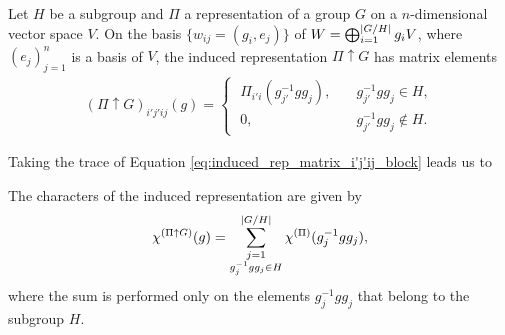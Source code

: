 \documentclass[12pt]{report}
\begin{document}
%

\begin{lemma} \label{lemma:induced_rep_matrix_i'j'ij_block}
Let $H$ be a subgroup and $\Pi$ a representation of a group $G$ on a $n$-dimensional vector space $V$. On the basis $\{w_{ij} = (g_i, e_j)\}$ of $W = \bigoplus_{i=1}^{\abs{G/H}} g_i V$, where $(e_j)_{j=1}^n$ is a basis of $V$, the induced representation $\Pi \uparrow G$ has matrix elements
\begin{align} \label{eq:induced_rep_matrix_i'j'ij_block}
(\Pi \uparrow G)_{i'j'ij}(g) =
\begin{cases}
\; \Pi_{i'i}(g_{j'}^{-1} g g_j), \quad & g_{j'}^{-1} g g_j \in H, \\
\; 0,  & g_{j'}^{-1} g g_j \notin H.
\end{cases}
\end{align}
\end{lemma}

Taking the trace of Equation \ref{eq:induced_rep_matrix_i'j'ij_block} leads us to

\begin{corollary} \label{coro:character_of_induced_rep}
The characters of the induced representation are given by
\begin{equation} \label{eq:character_induced_rep}
\chi^{(\Pi \uparrow G)}(g) = \sum_{\substack{j=1 \\ g_j^{-1} g g_j \in H}}^{\abs{G/H}} \chi^{(\Pi)} (g_j^{-1} g g_j),
\end{equation}
where the sum is performed only on the elements $g_j^{-1} g g_j$ that belong to the subgroup $H$.
\end{corollary}

\end{document}

